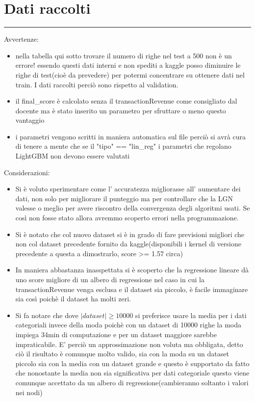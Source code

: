 \documentclass[11pt]{article}
\begin{document}
    \section{Dati raccolti}\label{dati-raccolti}

\begin{center}\rule{0.5\linewidth}{\linethickness}\end{center}

Avvertenze:

\begin{itemize}
\item
  nella tabella qui sotto trovare il numero di righe nel test a 500 non
  è un errore! essendo questi dati interni e non spediti a kaggle posso
  diminuire le righe di test(cioè da prevedere) per potermi concentrare
  su ottenere dati nel train. I dati raccolti perciò sono rispetto al
  validation.
\item
  il final\_score è calcolato senza il transactionRevenue come
  consigliato dal docente ma è stato inserito un parametro per sfruttare
  o meno questo vantaggio
\item
  i parametri vengono scritti in maniera automatica sul file perciò si
  avrà cura di tenere a mente che se il "tipo" == "lin\_reg" i parametri
  che regolano LightGBM non devono essere valutati
\end{itemize}

Considerazioni:

\begin{itemize}
\item
  Si è voluto sperimentare come l' accuratezza migliorasse all'
  aumentare dei dati, non solo per migliorare il punteggio ma per
  controllare che la LGN valesse o meglio per avere riscontro della
  convergenza degli algoritmi usati. Se così non fosse stato allora
  avremmo scoperto errori nella programmazione.
\item
  Si è notato che col nuovo dataset si è in grado di fare previsioni
  migliori che non col dataset precedente fornito da kaggle(disponibili
  i kernel di versione precedente a questa a dimostrarlo, score
  \textgreater{}= 1.57 circa)
\item
  In maniera abbastanza inasspettata si è scoperto che la regressione
  lineare dà uno score migliore di un albero di regressione nel caso in
  cui la transactionRevenue venga esclusa e il dataset sia piccolo, è
  facile immaginare sia così poichè il dataset ha molti zeri.
\item
  Si fa notare che dove \(|dataset| \geqslant 10000\) si preferisce
  usare la media per i dati categoriali invece della moda poichè con un
  dataset di 10000 righe la moda impiega 34min di computazione e per un
  dataset maggiore sarebbe impraticabile. E' perciò un approssimazione
  non voluta ma obbligata, detto ciò il risultato è comunque molto
  valido, sia con la moda su un dataset piccolo sia con la media con un
  dataset grande e questo è supportato da fatto che nonostante la media
  non sia significativa per dati categoriale questo viene comunque
  accettato da un albero di regressione(cambieranno soltanto i valori
  nei nodi)
\end{itemize}
\end{document}
